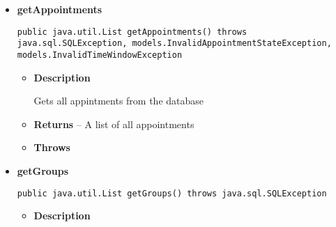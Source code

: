 {{{{\begin{itemize}
{\begin{itemize}
{Deletes a single Group from the database
}
\item{
{\bf  Parameters}
  \begin{itemize}
   \item{
\texttt{group} -- the group to be deleted}
  \end{itemize}
}%
\item{{\bf  Throws}
}%
\end{itemize}
}%
\item{ 
\hypertarget{repository.DBRepository.getAppointments()}{{\bf  getAppointments}\\}
\begin{lstlisting}[frame=none]
public java.util.List getAppointments() throws java.sql.SQLException, models.InvalidAppointmentStateException, models.InvalidTimeWindowException\end{lstlisting} %
\begin{itemize}
\item{
{\bf  Description}

Gets all appintments from the database
}
\item{{\bf  Returns} -- 
A list of all appointments 
}%
\item{{\bf  Throws}
}%
\end{itemize}
}%
\item{ 
\hypertarget{repository.DBRepository.getGroups()}{{\bf  getGroups}\\}
\begin{lstlisting}[frame=none]
public java.util.List getGroups() throws java.sql.SQLException\end{lstlisting} %
\begin{itemize}
\item{
{\bf  Description}

}
\end{itemize}}
\end{itemize}}}}}
